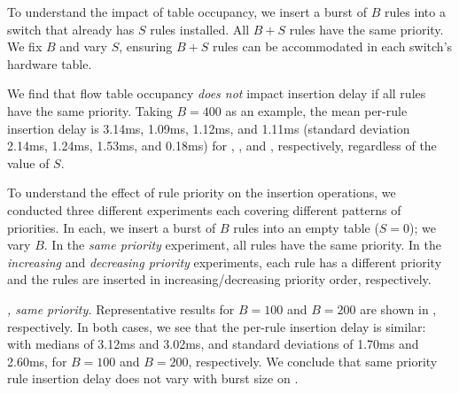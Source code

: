 
 To understand the impact of table occupancy, we
insert a burst of $B$ rules into a switch that already has $S$ rules
installed. All $B+S$ rules have the same priority. We fix $B$ and
vary $S$, ensuring $B+S$ rules can be accommodated in each switch's hardware
table.


We find that flow table occupancy {\em
does not} impact insertion delay if all rules have the same priority.
Taking $B=400$ as an example, the mean per-rule insertion delay is 3.14ms, 
1.09ms, 1.12ms, and 1.11ms (standard deviation 2.14ms, 1.24ms, 1.53ms, and
        0.18ms) for \BroadcomOne, \BroadcomThree, \IBM
and \Intel, respectively, regardless of the value of $S$. 

 To understand the effect of rule priority on the
insertion operations, we conducted three different experiments each covering
different patterns of priorities. In each, we insert a burst of $B$ rules
into an empty table ($S=0$); we vary $B$. In the {\em same priority}
experiment, all rules have the same priority. In the {\em increasing} and
{\em decreasing priority} experiments, each rule has a different priority and
the rules are inserted in increasing/decreasing priority order, respectively. 

\emph{\BroadcomOne, same priority.} 
Representative results for $B=100$ and $B=200$ are shown in
, respectively. In both
cases, we see that the per-rule insertion delay is similar: with
medians of 3.12ms and 3.02ms, and standard deviations of 1.70ms and 2.60ms, 
for $B=100$ and $B=200$, respectively. 
We conclude that same priority rule insertion delay does not vary with burst size on \BroadcomOne.

